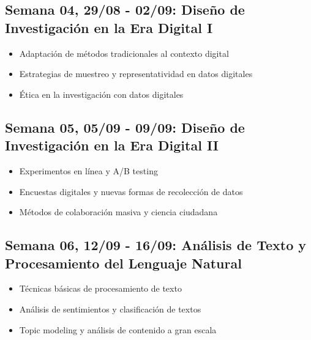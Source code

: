 \documentclass[11pt,letter,]{article}
\providecommand{\tightlist}{%
  \setlength{\itemsep}{0pt}\setlength{\parskip}{0pt}}
\begin{document}
\hypertarget{semana-04-2908---0209-diseuxf1o-de-investigaciuxf3n-en-la-era-digital-i}{%
\subsection{Semana 04, 29/08 - 02/09: Diseño de Investigación en la Era
Digital
I}\label{semana-04-2908---0209-diseuxf1o-de-investigaciuxf3n-en-la-era-digital-i}}

\begin{itemize}
\tightlist
\item
  Adaptación de métodos tradicionales al contexto digital
\item
  Estrategias de muestreo y representatividad en datos digitales
\item
  Ética en la investigación con datos digitales
\end{itemize}

\hypertarget{semana-05-0509---0909-diseuxf1o-de-investigaciuxf3n-en-la-era-digital-ii}{%
\subsection{Semana 05, 05/09 - 09/09: Diseño de Investigación en la Era
Digital
II}\label{semana-05-0509---0909-diseuxf1o-de-investigaciuxf3n-en-la-era-digital-ii}}

\begin{itemize}
\tightlist
\item
  Experimentos en línea y A/B testing
\item
  Encuestas digitales y nuevas formas de recolección de datos
\item
  Métodos de colaboración masiva y ciencia ciudadana
\end{itemize}

\hypertarget{semana-06-1209---1609-anuxe1lisis-de-texto-y-procesamiento-del-lenguaje-natural}{%
\subsection{Semana 06, 12/09 - 16/09: Análisis de Texto y Procesamiento
del Lenguaje
Natural}\label{semana-06-1209---1609-anuxe1lisis-de-texto-y-procesamiento-del-lenguaje-natural}}

\begin{itemize}
\tightlist
\item
  Técnicas básicas de procesamiento de texto
\item
  Análisis de sentimientos y clasificación de textos
\item
  Topic modeling y análisis de contenido a gran escala
\end{itemize}
\end{document}
